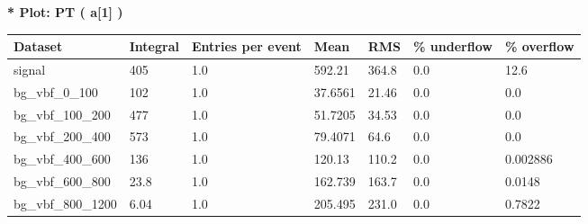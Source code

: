 \documentclass[a4paper, 10pt]{article}
\begin{document}
\textbf{* Plot: PT ( a[1] ) }\\
   \begin{table}[H]
  \begin{center}
    \begin{tabular}{|m{23.0mm}|m{23.0mm}|m{18.0mm}|m{19.0mm}|m{19.0mm}|m{19.0mm}|m{19.0mm}|}
      \hline
      {\cellcolor{yellow}         Dataset}& {\cellcolor{yellow}         Integral}& {\cellcolor{yellow}         Entries per event}& {\cellcolor{yellow}         Mean}& {\cellcolor{yellow}         RMS}& {\cellcolor{yellow}         \% underflow}& {\cellcolor{yellow}         \% overflow}\\
      \hline
      {\cellcolor{white}         signal}& {\cellcolor{white}         405}& {\cellcolor{white}         1.0}& {\cellcolor{white}         592.21}& {\cellcolor{white}         364.8}& {\cellcolor{orange}         0.0}& {\cellcolor{orange}         12.6}\\
      \hline
      {\cellcolor{white}         bg\_vbf\_0\_100}& {\cellcolor{white}         102}& {\cellcolor{white}         1.0}& {\cellcolor{white}         37.6561}& {\cellcolor{white}         21.46}& {\cellcolor{green}         0.0}& {\cellcolor{green}         0.0}\\
      \hline
      {\cellcolor{white}         bg\_vbf\_100\_200}& {\cellcolor{white}         477}& {\cellcolor{white}         1.0}& {\cellcolor{white}         51.7205}& {\cellcolor{white}         34.53}& {\cellcolor{green}         0.0}& {\cellcolor{green}         0.0}\\
      \hline
      {\cellcolor{white}         bg\_vbf\_200\_400}& {\cellcolor{white}         573}& {\cellcolor{white}         1.0}& {\cellcolor{white}         79.4071}& {\cellcolor{white}         64.6}& {\cellcolor{green}         0.0}& {\cellcolor{green}         0.0}\\
      \hline
      {\cellcolor{white}         bg\_vbf\_400\_600}& {\cellcolor{white}         136}& {\cellcolor{white}         1.0}& {\cellcolor{white}         120.13}& {\cellcolor{white}         110.2}& {\cellcolor{green}         0.0}& {\cellcolor{green}         0.002886}\\
      \hline
      {\cellcolor{white}         bg\_vbf\_600\_800}& {\cellcolor{white}         23.8}& {\cellcolor{white}         1.0}& {\cellcolor{white}         162.739}& {\cellcolor{white}         163.7}& {\cellcolor{green}         0.0}& {\cellcolor{green}         0.0148}\\
      \hline
      {\cellcolor{white}         bg\_vbf\_800\_1200}& {\cellcolor{white}         6.04}& {\cellcolor{white}         1.0}& {\cellcolor{white}         205.495}& {\cellcolor{white}         231.0}& {\cellcolor{green}         0.0}& {\cellcolor{green}         0.7822}\\

\end{tabular}
\end{center}
\end{table}
\end{document}
